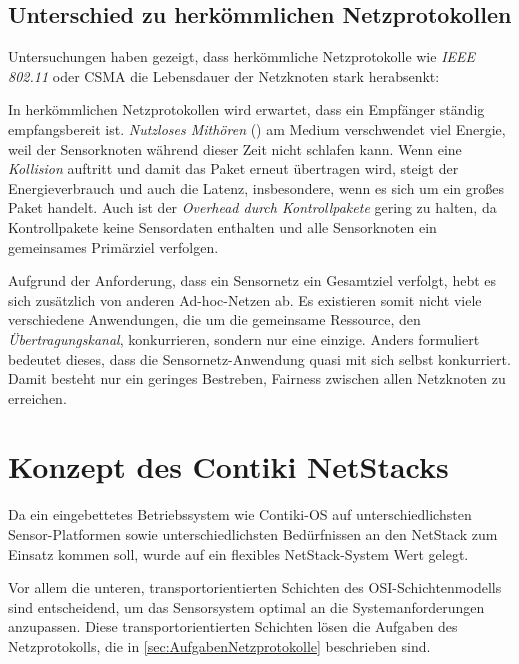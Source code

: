 \subsection{Unterschied zu herkömmlichen Netzprotokollen}

	Untersuchungen haben gezeigt, dass herkömmliche Netzprotokolle wie
	\emph{IEEE 802.11} oder \acs{CSMA} die Lebensdauer der Netzknoten stark
	herabsenkt:

	In herkömmlichen Netzprotokollen wird erwartet, dass ein Empfänger
	ständig empfangsbereit ist. \emph{Nutzloses Mithören} () am Medium verschwendet viel Energie, weil der Sensorknoten
	während dieser Zeit nicht schlafen kann.  Wenn eine \emph{Kollision}
	auftritt und damit das Paket erneut übertragen wird, steigt der
	Energieverbrauch und auch die Latenz, insbesondere, wenn es sich um ein
	großes Paket handelt.  Auch ist der \emph{Overhead durch
	Kontrollpakete} gering zu halten, da Kontrollpakete keine Sensordaten
	enthalten und alle Sensorknoten ein gemeinsames Primärziel verfolgen.

	Aufgrund der Anforderung, dass ein Sensornetz ein Gesamtziel verfolgt,
	hebt es sich zusätzlich von anderen Ad-hoc-Netzen ab.  Es existieren
	somit nicht viele verschiedene Anwendungen, die um die gemeinsame
	Ressource, den \emph{Übertragungskanal}, konkurrieren, sondern nur eine
	einzige. Anders formuliert bedeutet dieses, dass die
	Sensornetz-Anwendung quasi mit sich selbst konkurriert.  Damit besteht
	nur ein geringes Bestreben, Fairness zwischen allen Netzknoten zu
	erreichen.




\section{Konzept des Contiki NetStacks}

	Da ein eingebettetes Betriebssystem wie Contiki-OS auf
	unterschiedlichsten Sensor-Platformen sowie unterschiedlichsten
	Bedürfnissen an den \acf{NetStack} zum Einsatz kommen soll, wurde auf
	ein flexibles \acl{NetStack}-System Wert gelegt.

	Vor allem die unteren, transportorientierten Schichten des
	OSI-Schichtenmodells sind entscheidend, um das Sensorsystem optimal an
	die Systemanforderungen anzupassen.  Diese transportorientierten
	Schichten lösen die Aufgaben des Netzprotokolls, die in
	\autoref{sec:AufgabenNetzprotokolle} beschrieben sind.

